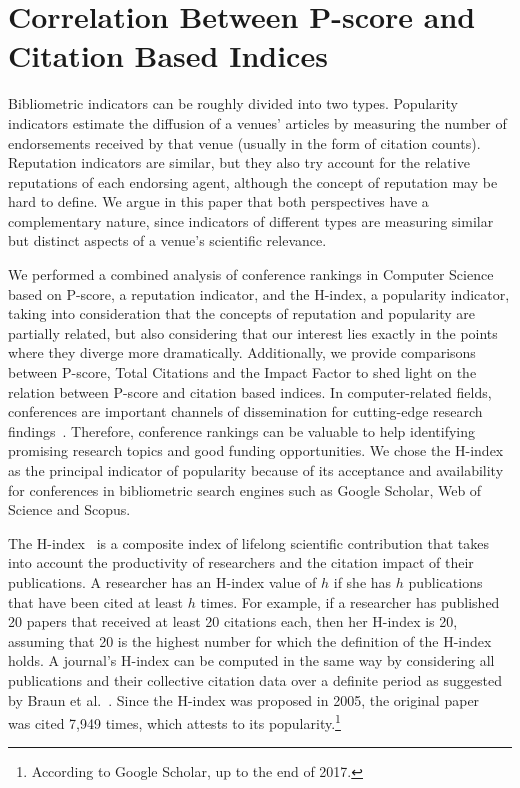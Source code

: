 \documentclass[notitlepage]{svjour3}
\begin{document}
\section{Correlation Between P-score and Citation Based Indices} 
\label{sec:correlation}

Bibliometric indicators can be roughly divided into two types. Popularity indicators 
estimate the diffusion of a venues' articles by measuring the number of
endorsements received by that venue (usually in the form of citation counts). Reputation
indicators are similar, but they also try account for the relative reputations of each
endorsing agent, although the concept of reputation may be hard to define.
We argue in this paper that both perspectives have a complementary nature,
since indicators of different types are measuring similar but distinct aspects of
a venue's scientific relevance. 

We performed a combined analysis of conference rankings in Computer Science based on 
P-score, a reputation indicator, and the H-index, a popularity indicator, 
taking into consideration that the concepts of reputation and popularity are
partially related, but also considering that our interest lies exactly in the points
where they diverge more dramatically. Additionally, 
we provide comparisons between P-score, Total Citations and the Impact Factor
to shed light on the relation between P-score and citation based indices.
In computer-related fields, conferences are important channels of dissemination for cutting-edge
research findings~\cite{Lee2019}. Therefore, conference rankings can be valuable to help
identifying promising research topics and good funding opportunities. 
We chose the H-index as the principal indicator of popularity because of its acceptance 
and availability for conferences in bibliometric search engines such as Google Scholar, 
Web of Science and Scopus. 

The H-index~\cite{Hirsch2005} is a composite index of lifelong scientific contribution that takes 
into account the productivity of researchers and the citation impact of their publications.
A researcher has an H-index value of $ h $ if she has $ h $ publications that have been cited at 
least $ h $ times. For example, if a researcher has published 20 papers that received at least 20 
citations each, then her H-index is 20, assuming that 20 is the highest number for which the 
definition of the H-index holds. A journal's H-index can be computed 
in the same way by considering all publications and their collective citation data over a 
definite period as suggested by Braun et al.~\cite{Braun2006}.
Since the H-index was proposed in 2005, the original paper~\cite{Hirsch2005} was 
cited 7,949 times, which attests to its popularity.\footnote{According to Google Scholar, up to the end of 2017.}
\end{document}
